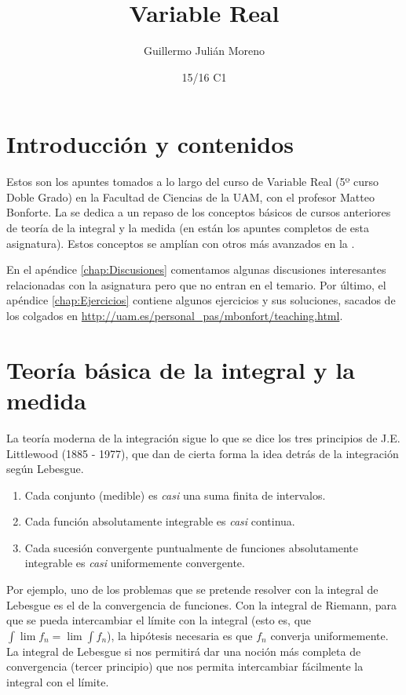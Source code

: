 \documentclass[nochap,palatino]{apuntes}
\title{Variable Real}
\author{Guillermo Julián Moreno}
\date{15/16 C1}
\begin{document}
\pagestyle{plain}
\maketitle

\tableofcontents
\newpage
\section*{Introducción y contenidos}

Estos son los apuntes tomados a lo largo del curso de Variable Real (5º curso Doble Grado) en la Facultad de Ciencias de la UAM, con el profesor Matteo Bonforte. La  se dedica a un repaso de los conceptos básicos de cursos anteriores de teoría de la integral y la medida (en \citep{ApuntesTIM} están los apuntes completos de esta asignatura). Estos conceptos se amplían con otros más avanzados en la .

En el apéndice \ref{chap:Discusiones} comentamos algunas discusiones interesantes relacionadas con la asignatura pero que no entran en el temario. Por último, el apéndice \ref{chap:Ejercicios} contiene algunos ejercicios y sus soluciones, sacados de los colgados en \url{http://uam.es/personal_pas/mbonfort/teaching.html}.

\section{Teoría básica de la integral y la medida}
\label{sec:TeoriaBasicaIntegral}

La teoría moderna de la integración sigue lo que se dice los tres principios de J.E. Littlewood (1885 - 1977), que dan de cierta forma la idea detrás de la integración según Lebesgue.

\begin{enumerate}
\item Cada conjunto (medible) es \textit{casi} una suma finita de intervalos.
\item Cada función absolutamente integrable es \textit{casi} continua.
\item Cada sucesión convergente puntualmente de funciones absolutamente integrable es \textit{casi} uniformemente convergente.
\end{enumerate}

Por ejemplo, uno de los problemas que se pretende resolver con la integral de Lebesgue es el de la convergencia de funciones. Con la integral de Riemann, para que se pueda intercambiar el límite con la integral (esto es, que $\int \lim f_n = \lim \int f_n$), la hipótesis necesaria es que $f_n$ converja uniformemente. La integral de Lebesgue si nos permitirá dar una noción más completa de convergencia (tercer principio) que nos permita intercambiar fácilmente la integral con el límite.
\end{document}
